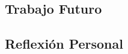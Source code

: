 
\subsection{Trabajo Futuro}
\label{subsec:trabajo-futuro}




\subsection{Reflexi\'on Personal}
\label{subsec:reflexion}

